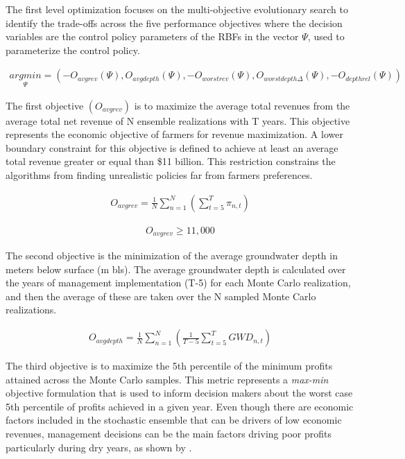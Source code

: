 \documentclass[a4paper,fleqn]{cas-sc}
\begin{document}
The first level optimization focuses on the multi-objective evolutionary search to identify the trade-offs across the five performance objectives where the decision variables are the control policy parameters of the RBFs in the vector $\Psi$, used to parameterize the control policy. 

\begin{align}
\underset{\Psi}{argmin} = (-O_{avgrev}(\Psi),O_{avgdepth}(\Psi),-O_{worstrev}(\Psi),O_{worstdepth\Delta}(\Psi),-O_{depthrel}(\Psi))
\end{align}

The first objective $(O_{avgrev})$ is to maximize the average total revenues  from the average total net revenue of N ensemble realizations with T years. This objective represents the economic objective of farmers for revenue maximization. A lower boundary constraint for this objective is defined to achieve at least an average total revenue greater or equal than \$11 billion. This restriction constrains the algorithms from finding unrealistic policies far from farmers preferences. 

\begin{align}
O_{avgrev} = \frac{1}{N}\sum_{n=1}^N(\sum_{t=5}^T \pi_{n,t})
\end{align}


\begin{align}
O_{avgrev} \geq 11,000
\end{align}

The second objective is the minimization of the average groundwater depth in meters below surface (m bls). The average groundwater depth is calculated over the years of management implementation (T-5) for each Monte Carlo realization, and then the average of these are taken over the N sampled Monte Carlo realizations. 

\begin{align}
O_{avgdepth} = \frac{1}{N}\sum_{n=1}^N(\frac{1}{T-5}\sum_{t=5}^T GWD_{n,t})
\end{align}

The third objective is to maximize the 5th percentile of the minimum profits attained across the Monte Carlo samples. This metric represents a \textit{max-min} objective formulation that is used to inform decision makers about the worst case 5th percentile of profits achieved in a given year. Even though there are economic factors included in the stochastic ensemble that can be drivers of low economic revenues, management decisions can be the main factors driving poor profits particularly during dry years, as shown by \citet{rodriguez-flores_global_2022}. 
\end{document}
